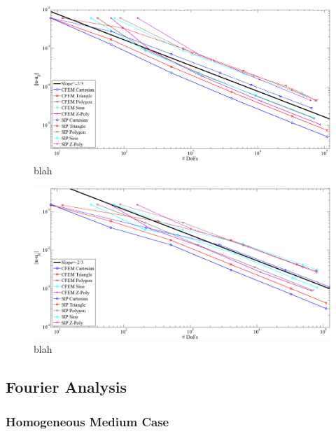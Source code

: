 \begin{figure}
\centering
\includegraphics[width=\textwidth]{figures/sec_DSA/SIP_mms_3d_quad_full_paint.png}
\caption{blah}
\label{fig::SIP_mms_quad_error_plot}
\end{figure}

\begin{figure}
\centering
\includegraphics[width=\textwidth]{figures/sec_DSA/SIP_mms_3d_gauss_full_paint.png}
\caption{blah}
\label{fig::SIP_mms_gauss_error_plot}
\end{figure}


\subsection{Fourier Analysis}
\label{sec::DSA_Results_Fourier}

\subsubsection{Homogeneous Medium Case}
\label{sec::DSA_Results_Fourier_Homo}

